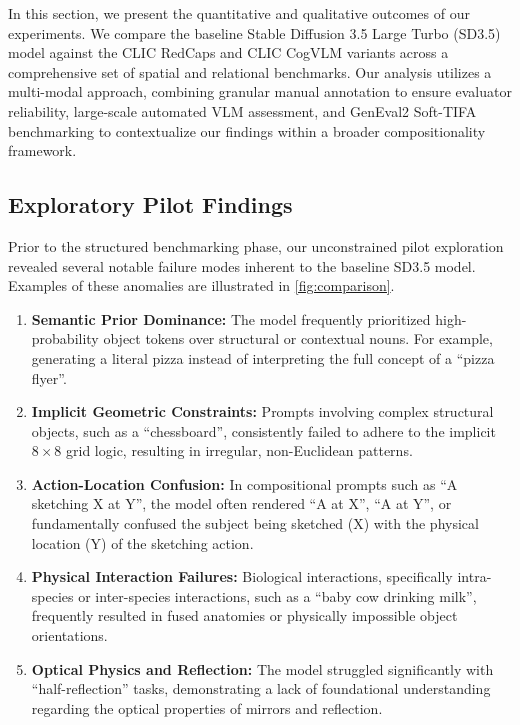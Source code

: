 In this section, we present the quantitative and qualitative outcomes of our experiments. We compare the baseline Stable Diffusion 3.5 Large Turbo (SD3.5) model against the CLIC RedCaps and CLIC CogVLM variants across a comprehensive set of spatial and relational benchmarks. Our analysis utilizes a multi-modal approach, combining granular manual annotation to ensure evaluator reliability, large-scale automated VLM assessment, and GenEval2 Soft-TIFA benchmarking to contextualize our findings within a broader compositionality framework.

\subsection{Exploratory Pilot Findings}
Prior to the structured benchmarking phase, our unconstrained pilot exploration revealed several notable failure modes inherent to the baseline SD3.5 model. Examples of these anomalies are illustrated in \cref{fig:comparison}.

\begin{enumerate}
    \item \textbf{Semantic Prior Dominance:} The model frequently prioritized high-probability object tokens over structural or contextual nouns. For example, generating a literal pizza instead of interpreting the full concept of a ``pizza flyer''.
    \item \textbf{Implicit Geometric Constraints:} Prompts involving complex structural objects, such as a ``chessboard'', consistently failed to adhere to the implicit $8 \times 8$ grid logic, resulting in irregular, non-Euclidean patterns.
    \item \textbf{Action-Location Confusion:} In compositional prompts such as ``A sketching X at Y'', the model often rendered ``A at X'', ``A at Y'', or fundamentally confused the subject being sketched (X) with the physical location (Y) of the sketching action.
    \item \textbf{Physical Interaction Failures:} Biological interactions, specifically intra-species or inter-species interactions, such as a ``baby cow drinking milk'', frequently resulted in fused anatomies or physically impossible object orientations.
    \item \textbf{Optical Physics and Reflection:} The model struggled significantly with ``half-reflection'' tasks, demonstrating a lack of foundational understanding regarding the optical properties of mirrors and reflection.
\end{enumerate}

